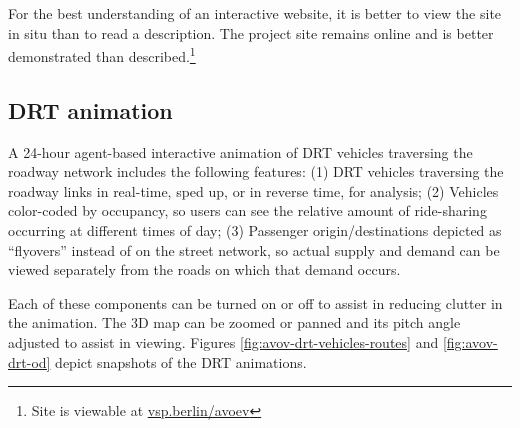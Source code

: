 For the best understanding of an interactive website, it is better to view the site in situ than to read a description. The project site remains online and is better demonstrated than described.\footnote{Site is viewable at \href{https://vsp.berlin/avoev/}{vsp.berlin/avoev}}

\subsection{DRT animation}

A 24-hour agent-based interactive animation of DRT vehicles traversing the roadway network includes the following features: (1) DRT vehicles traversing the roadway links in real-time, sped up, or in reverse time, for analysis; (2) Vehicles color-coded by occupancy, so users can see the relative amount of ride-sharing occurring at different times of day; (3) Passenger origin/destinations depicted as ``flyovers'' instead of on the street network, so actual supply and demand can be viewed separately from the roads on which that demand occurs.

Each of these components can be turned on or off to assist in reducing clutter in the animation. The 3D map can be zoomed or panned and its pitch angle adjusted to assist in viewing. Figures \ref{fig:avov-drt-vehicles-routes} and \ref{fig:avov-drt-od} depict snapshots of the DRT animations.

